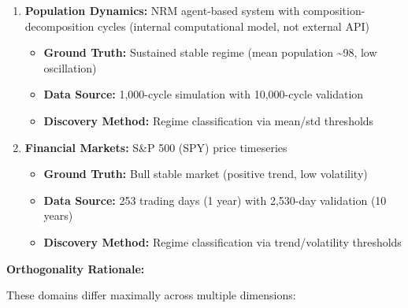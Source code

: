 \documentclass[
]{article}
\providecommand{\tightlist}{%
  \setlength{\itemsep}{0pt}\setlength{\parskip}{0pt}}
\begin{document}
\begin{enumerate}
\def\labelenumi{\arabic{enumi}.}
\tightlist
\item
  \textbf{Population Dynamics:} NRM agent-based system with
  composition-decomposition cycles (internal computational model, not
  external API)

  \begin{itemize}
  \tightlist
  \item
    \textbf{Ground Truth:} Sustained stable regime (mean population
    \textasciitilde98, low oscillation)
  \item
    \textbf{Data Source:} 1,000-cycle simulation with 10,000-cycle
    validation
  \item
    \textbf{Discovery Method:} Regime classification via mean/std
    thresholds
  \end{itemize}
\item
  \textbf{Financial Markets:} S\&P 500 (SPY) price timeseries

  \begin{itemize}
  \tightlist
  \item
    \textbf{Ground Truth:} Bull stable market (positive trend, low
    volatility)
  \item
    \textbf{Data Source:} 253 trading days (1 year) with 2,530-day
    validation (10 years)
  \item
    \textbf{Discovery Method:} Regime classification via
    trend/volatility thresholds
  \end{itemize}
\end{enumerate}

\textbf{Orthogonality Rationale:}

These domains differ maximally across multiple dimensions:
\end{document}
